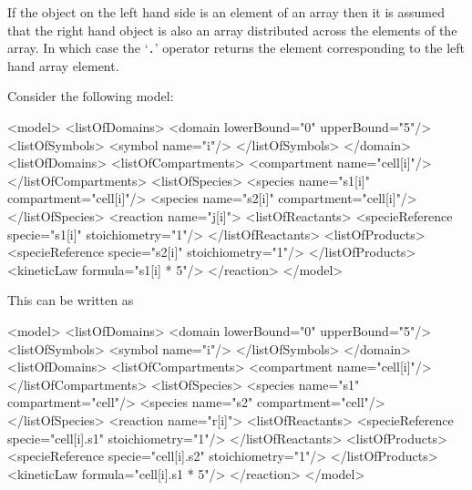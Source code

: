\documentclass{cekarticle}
\begin{document}
If the object on the left hand side is an element of an
array then it is assumed that the right hand object is also an array
distributed across the elements of the array. In which case
the `\texttt{.}' operator returns the element
corresponding to the left hand array element.

Consider the following model:

\begin{example}
<model>
    <listOfDomains>
        <domain lowerBound="0" upperBound="5"/>
            <listOfSymbols>
                <symbol name="i"/>
            </listOfSymbols>
        </domain>
    <listOfDomains>
    <listOfCompartments>
        <compartment name="cell[i]"/>
    </listOfCompartments>
    <listOfSpecies>
        <species name="s1[i]" compartment="cell[i]"/>
        <species name="s2[i]" compartment="cell[i]"/>
    </listOfSpecies>
    <reaction name="j[i]">
        <listOfReactants>
            <specieReference specie="s1[i]" stoichiometry="1"/>
        </listOfReactants>
        <listOfProducts>
            <specieReference specie="s2[i]" stoichiometry="1"/>
        </listOfProducts>
        <kineticLaw formula="s1[i] * 5"/>
    </reaction>
</model>
\end{example}
This can be written as
\begin{example}
<model>
    <listOfDomains>
        <domain lowerBound="0" upperBound="5"/>
            <listOfSymbols>
                <symbol name="i"/>
            </listOfSymbols>
        </domain>
    <listOfDomains>
    <listOfCompartments>
        <compartment name="cell[i]"/>
    </listOfCompartments>
    <listOfSpecies>
        <species name="s1" compartment="cell"/>
        <species name="s2" compartment="cell"/>
    </listOfSpecies>
    <reaction name="r[i]">
        <listOfReactants>
            <specieReference specie="cell[i].s1" stoichiometry="1"/>
        </listOfReactants>
        <listOfProducts>
            <specieReference specie="cell[i].s2" stoichiometry="1"/>
        </listOfProducts>
        <kineticLaw formula="cell[i].s1 * 5"/>
    </reaction>
</model>
\end{example}
\end{document}
